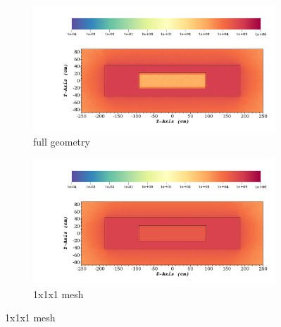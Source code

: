 \begin{figure}
	\begin{subfigure}[t]{0.5\textwidth}
		\includegraphics[width=\linewidth, trim={8cm 2cm 2cm 10cm},clip]{../figs/toy_p2/dose_VPII_original.png}
		\caption{full geometry}
		\label{fig:2dose_orig}
	\end{subfigure}\hfill
	\begin{subfigure}[t]{0.5\textwidth}
		\includegraphics[width=\linewidth, trim={8cm 2cm 2cm 10cm},clip]{../figs/toy_p2/dose_VPII_1x_mesh.png}
		\caption{1x1x1 mesh}
		\label{fig:2dose_1x_mesh}
	\end{subfigure}


\end{figure}
